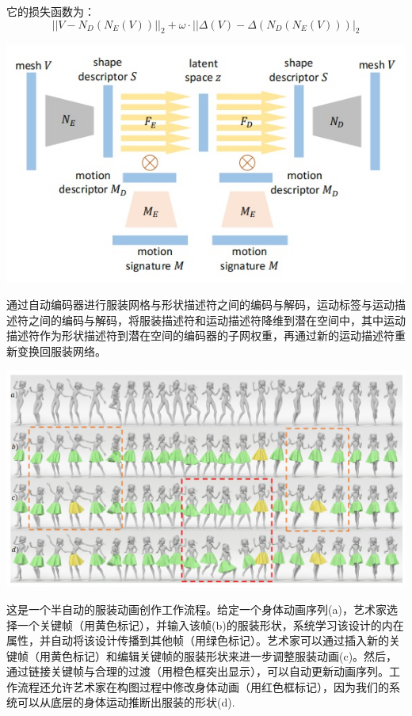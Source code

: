 \documentclass{CLGPY}
\begin{document}
\begin{multicols}{2}
		它的损失函数为：
       \begin{equation}
			||V-N_{D}(N_{E}(V))||_{2}+\omega\cdot||\Delta(V)-\Delta(N_{D}(N_{E}(V)))|_{2}
		\end{equation}

        \begin{center}
            \includegraphics[width=1.0\linewidth]{./fig/auto-encode.jpg}
        \end{center}

​		通过自动编码器进行服装网格与形状描述符之间的编码与解码，运动标签与运动描述符之间的编码与解码，将服装描述符和运动描述符降维到潜在空间中，其中运动描述符作为形状描述符到潜在空间的编码器的子网权重，再通过新的运动描述符重新变换回服装网络。

        \begin{center}
            \includegraphics[width=1.0\linewidth]{./fig/animation.jpg}
        \end{center}

		这是一个半自动的服装动画创作工作流程。给定一个身体动画序列(a)，艺术家选择一个关键帧（用黄色标记），并输入该帧(b)的服装形状，系统学习该设计的内在属性，并自动将该设计传播到其他帧（用绿色标记）。艺术家可以通过插入新的关键帧（用黄色标记）和编辑关键帧的服装形状来进一步调整服装动画(c)。然后，通过链接关键帧与合理的过渡（用橙色框突出显示），可以自动更新动画序列。工作流程还允许艺术家在构图过程中修改身体动画（用红色框标记），因为我们的系统可以从底层的身体运动推断出服装的形状(d).


\end{multicols}
\end{document}
